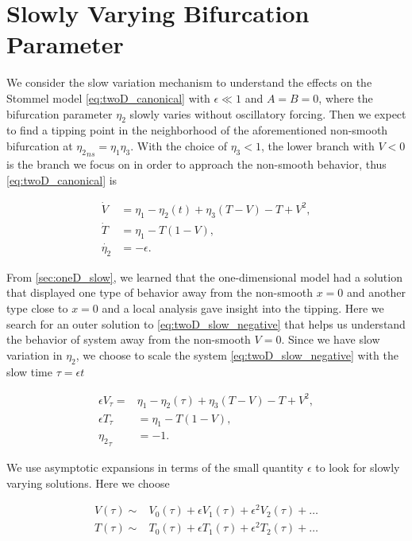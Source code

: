 \section{Slowly Varying Bifurcation Parameter}
\label{sec:twoD_slow}

We consider the slow variation mechanism to understand the effects on the Stommel model \eqref{eq:twoD_canonical} with $\epsilon\ll 1$ and $A=B=0$, where the bifurcation parameter $\eta_2$ slowly varies without oscillatory forcing. Then we expect to find a tipping point in the neighborhood of the aforementioned non-smooth bifurcation at ${\eta_2}_{ns}=\eta_1\eta_3$. With the choice of $\eta_3<1$, the lower branch with $V<0$ is the branch we focus on in order to approach the non-smooth behavior, thus \eqref{eq:twoD_canonical} is

\begin{equation}\label{eq:twoD_slow_negative}
 \begin{aligned}
  \dot{V} & = \eta_1-\eta_2(t)+\eta_3(T-V)-T+V^2, \\
  \dot{T} & = \eta_1-T(1-V), \\
 \dot{\eta_2} & = -\epsilon.
 \end{aligned}
\end{equation}

From \autoref{sec:oneD_slow}, we learned that the one-dimensional model had a solution that displayed one type of behavior away from the non-smooth $x=0$ and another type close to $x=0$ and a local analysis gave insight into the tipping. Here we search for an outer solution to \eqref{eq:twoD_slow_negative} that helps us understand the behavior of system away from the non-smooth $V=0$. Since we have slow variation in $\eta_2$, we choose to scale the system \eqref{eq:twoD_slow_negative} with the slow time $\tau=\epsilon t$

\begin{equation}\label{eq:twoD_slow_slowsystem}
\begin{aligned}
\epsilon V_\tau =&\eta_1-\eta_2(\tau)+\eta_3(T-V)-T+V^2, \\
\epsilon T_\tau & = \eta_1-T(1-V), \\
 {\eta_2}_\tau & = -1.
\end{aligned}
\end{equation}

We use asymptotic expansions in terms of the small quantity $\epsilon$ to look for slowly varying solutions. Here we choose

\begin{equation}\label{eq:twoD_slow_outerexpansion}
\begin{aligned}
V(\tau)\sim &V_0(\tau)+\epsilon V_1(\tau)+\epsilon^2 V_2(\tau)+\ldots\\
T(\tau)\sim & T_0(\tau)+\epsilon T_1(\tau)+\epsilon^2 T_2(\tau)+\ldots
\end{aligned}
\end{equation}

